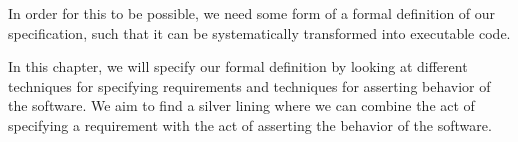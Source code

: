 In order for this to be possible, we need some form of a formal definition of our specification, such that it can be systematically transformed into executable code.

In this chapter, we will specify our formal definition by looking at different techniques for specifying requirements and techniques for asserting behavior of the software.
We aim to find a silver lining where we can combine the act of specifying a requirement with the act of asserting the behavior of the software. 